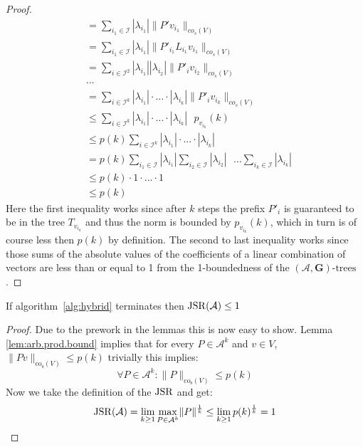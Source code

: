\begin{proof}
$$\begin{aligned}
  & = \sum \limits_{i_1 \in \mathcal{I}} |\lambda_{i_1}| \|P'v_{i_1} \|_{co_s(V)}\\
  & = \sum \limits_{i_1 \in \mathcal{I}} |\lambda_{i_1}| \|P'_{i_1}L_{i_1}v_{i_1} \|_{co_s(V)} \\ 
  & = \sum \limits_{i \in \mathcal{I}^2} |\lambda_{i_1}| |\lambda_{i_2}| \|P'_{i}v_{i_2} \|_{co_s(V)}\\
  & \cdots \\
  & = \sum \limits_{i \in \mathcal{I}^{k}} |\lambda_{i_1}| \cdot ... \cdot |\lambda_{i_k}| \|P'_{i}v_{i_{k}} \|_{co_s(V)}\\
  & \leq \sum \limits_{i \in \mathcal{I}^{k}} |\lambda_{i_1}| \cdot ... \cdot |\lambda_{i_k}| \text{ } p_{v_{i_k}}(k) \\
  & \leq p(k)\sum \limits_{i \in \mathcal{I}^{k}} |\lambda_{i_1}| \cdot ... \cdot |\lambda_{i_k}| \\
  & =  p(k)\sum \limits_{i_1 \in \mathcal{I}} |\lambda_{i_1}| \sum \limits_{i_2 \in \mathcal{I}} |\lambda_{i_2}| \text{ } ... \sum \limits_{i_k \in \mathcal{I}} |\lambda_{i_k}| \\
  & \leq p(k) \cdot 1 \cdot ... \cdot 1\\
  & \leq p(k)
\end{aligned}
$$
Here the first inequality works since after $k$ steps the prefix $P'_{i}$ is guaranteed to be in the tree $T_{v_{i_k}}$ and thus the norm is bounded by $p_{v_{i_k}}(k)$, which in turn is of course less then $p(k)$ by definition. The second to last inequality works since those sums of the absolute values of the coefficients of a linear combination of vectors are less than or equal to 1 from the 1-boundedness of the $(\mathcal{A},\mathbf{G})\text{-trees}$.
\end{proof}

\begin{theorem}{}\label{thm:hybrid-found}
If algorithm~\ref{alg:hybrid} terminates then $\operatorname{JSR}(\mathcal{A}) \leq 1$
\end{theorem}

\begin{proof}
  Due to the prework in the lemmas this is now easy to show. 
  Lemma \ref{lem:arb.prod.bound} implies that for every $P \in \mathcal{A}^k$ and $v \in V$, $\lVert Pv \rVert _{\text{co}_{\text{s}}(V)} \le p(k)$
  trivially this implies: 
  $$
    \forall P \in \mathcal{A}^k: \lVert P \rVert _{\text{co}_{\text{s}}(V)} \le p(k)
  $$
  Now we take the definition of the $\operatorname{JSR}$ and get:
  $$
    \operatorname{JSR}(\mathcal{A}) = \lim_{k \geq 1} \max_{P \in \mathcal{A}^k} \lVert P \rVert^\frac{1}{k} \le \lim_{k \geq 1} p(k)^\frac{1}{k} = 1
  $$ 
\end{proof}

